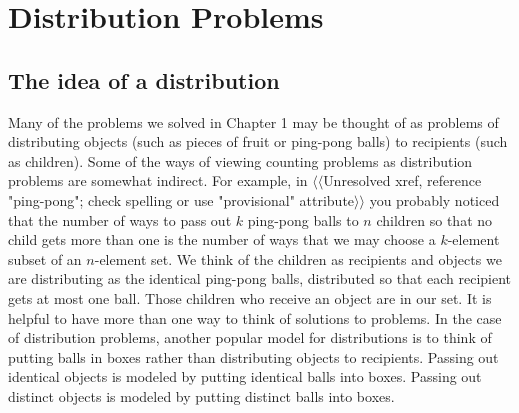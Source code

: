\documentclass[10pt,]{book}
\theoremstyle{plain}
\theoremstyle{definition}
\numberwithin{equation}{chapter}
\begin{document}
\chapter[{Distribution Problems}]{Distribution Problems}\label{chapter-2}
\typeout{************************************************}
\typeout{************************************************}
\section[{The idea of a distribution}]{The idea of a distribution}\label{section-4}
\typeout{************************************************}
\typeout{************************************************}
Many of the problems we solved in Chapter 1 may be thought of as problems of distributing objects (such as pieces of fruit or ping-pong balls) to recipients (such as children). Some of the ways of viewing counting problems as distribution problems are somewhat indirect. For example, in {$\langle\langle$Unresolved xref, reference "ping-pong"; check spelling or use "provisional" attribute$\rangle\rangle$} you probably noticed that the number of ways to pass out \(k\) ping-pong balls to \(n\) children so that no child gets more than one is the number of ways that we may choose a \(k\)-element subset of an \(n\)-element set. We think of the children as recipients and objects we are distributing as the identical ping-pong balls, distributed so that each recipient gets at most one ball. Those children who receive an object are in our set. It is helpful to have more than one way to think of solutions to problems. In the case of distribution problems, another popular model for distributions is to think of putting balls in boxes rather than distributing objects to recipients. Passing out identical objects is modeled by putting identical balls into boxes. Passing out distinct objects is modeled by putting distinct balls into boxes.%
\typeout{************************************************}
\typeout{************************************************}
\end{document}
